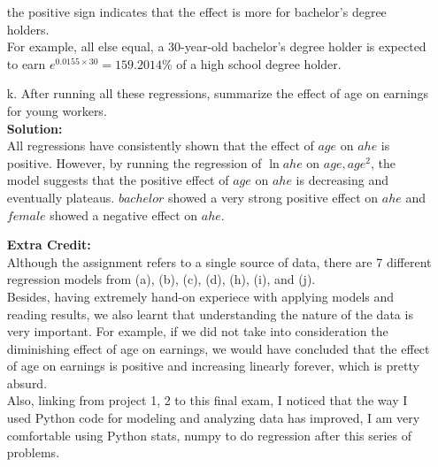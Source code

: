 \documentclass{uofa-eng-assignment}
\begin{document}
\begin{enumerate}
        the positive sign indicates that the effect is more for bachelor's degree holders. \\
        For example, all else equal, a 30-year-old bachelor's degree holder is expected to earn $e^{0.0155 \times 30} = 159.2014\%$
        of a high school degree holder.
    \item[k.] After running all these regressions, summarize the effect of age on
        earnings for young workers.\\ \textbf{Solution:}\\ All regressions have
        consistently shown that the effect of $age$ on $ahe$ is positive. However, by
        running the regression of $\ln{ahe}$ on $age, age^2$, the model suggests that
        the positive effect of $age$ on $ahe$ is decreasing and eventually plateaus.
        $bachelor$ showed a very strong positive effect on $ahe$ and $female$ showed a
        negative effect on $ahe$. \newpage

    \item[] \textbf{Extra Credit:} \\
        Although the assignment refers to a single source of data, there are 7 different regression models
        from (a), (b), (c), (d), (h), (i), and (j).  \\
        Besides, having extremely hand-on experiece with applying models and reading results, we also learnt
        that understanding the nature of the data is very important. For example, if we did not take
        into consideration the diminishing effect of age on earnings, we would have concluded that
        the effect of age on earnings is positive and increasing linearly forever, which is pretty absurd. \\
        Also, linking from project 1, 2 to this final exam, I noticed that the way I used Python code for 
        modeling and analyzing data has improved, I am very comfortable using Python stats, numpy to do 
        regression after this series of problems. \\
\end{enumerate}
\end{document}
